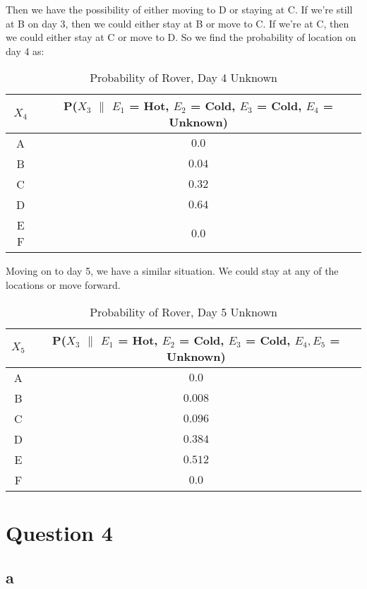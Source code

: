 \documentclass{article}
\begin{document}
		Then we have the possibility of either moving to D or staying at C. If we're still at B on day 3, then we could either stay at B or move to C. If we're at C, then we could either stay at C or move to D. So we find the probability of location on day 4 as:

		\begin{table}[h!]
			\begin{center}
				\caption{Probability of Rover, Day 4 Unknown}
				\begin{tabular}{c|c}
				\textbf{$X_4$} & \textbf{P($X_3$ $\|$ $E_1$ = Hot, $E_2$ = Cold, $E_3$ = Cold, $E_4$ = Unknown)}\\
				\hline
				A & $0.0$\\
				B & $0.04$\\
				C & $0.32$\\
				D & $0.64$\\
				E F & $0.0$\\
				\end{tabular}
			\end{center}
		\end{table}

		Moving on to day 5, we have a similar situation. We could stay at any of the locations or move forward.

		\begin{table}[h!]
			\begin{center}
				\caption{Probability of Rover, Day 5 Unknown}
				\begin{tabular}{c|c}
				\textbf{$X_5$} & \textbf{P($X_3$ $\|$ $E_1$ = Hot, $E_2$ = Cold, $E_3$ = Cold, $E_4, E_5$ = Unknown)}\\
				\hline
				A & $0.0$\\
				B & $0.008$\\
				C & $0.096$\\
				D & $0.384$\\
				E & $0.512$\\
				F & $0.0$\\
				\end{tabular}
			\end{center}
		\end{table}

\section*{Question 4}
	\subsection*{a}
\end{document}
